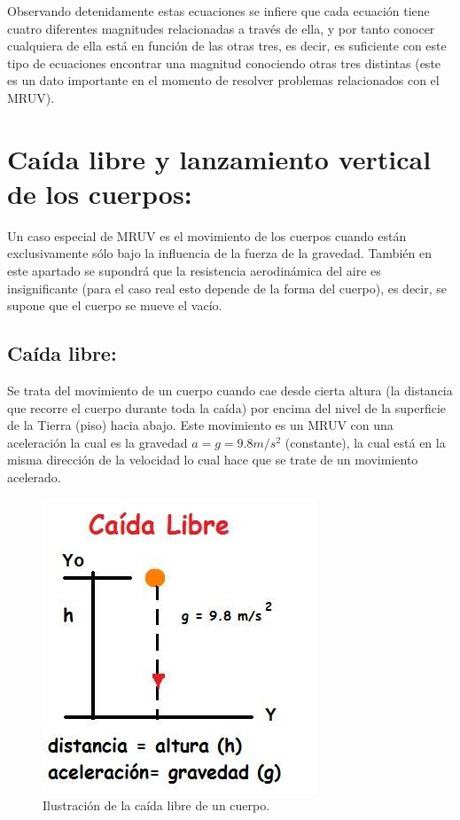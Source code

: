 \documentclass[a5paper,pagesize,10pt,bibtotoc,pointlessnumbers,
normalheadings,DIV=9,fleqn,x11names,table,twoside=false]{scrbook}
\begin{document}
Observando detenidamente estas ecuaciones se infiere que cada ecuación tiene cuatro diferentes magnitudes relacionadas 
a través de ella, y por tanto conocer cualquiera de ella está en función de las otras tres, es decir, es suficiente con 
este tipo de ecuaciones encontrar una magnitud conociendo otras tres distintas (este es un dato importante en el 
momento 
de resolver problemas relacionados con el MRUV).

\section{Caída libre y lanzamiento vertical de los cuerpos:}

Un caso especial de MRUV es el movimiento de los cuerpos cuando están exclusivamente sólo bajo la influencia de la fuerza de la 
gravedad. También en este apartado se supondrá que la resistencia aerodinámica del aire es insignificante (para el caso real esto 
depende de la forma del cuerpo), es decir, se supone que el cuerpo se mueve el vacío. 

\subsection{Caída libre:}

Se trata del movimiento de un cuerpo cuando cae desde cierta altura (la distancia que recorre el cuerpo durante toda la caída) 
por encima del nivel de la superficie de la Tierra (piso) hacia abajo. Este movimiento es un MRUV con una aceleración la cual es 
la gravedad $a = g = 9.8 m/s^2$ (constante), la cual está en la misma dirección de la velocidad lo cual hace que se trate de un 
movimiento acelerado. 

\begin{figure}[ht]
 \centering
 \includegraphics[scale=0.5]{images/caida-libre.jpg}
 \caption{Ilustración de la caída libre de un cuerpo.}\label{caidalibre}
\end{figure} 
\end{document}
